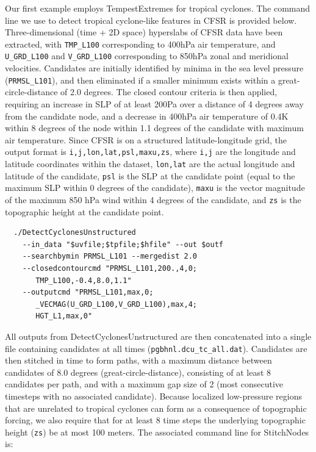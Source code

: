 \documentclass[gmdd, hvmath, online]{copernicus_discussions}
\begin{document}
Our first example employs TempestExtremes for tropical cyclones.  The command line we use to detect tropical cyclone-like features in CFSR is provided below.  Three-dimensional (time + 2D space) hyperslabs of CFSR data have been extracted, with \texttt{TMP\_L100} corresponding to 400hPa air temperature, and \texttt{U\_GRD\_L100} and \texttt{V\_GRD\_L100} corresponding to 850hPa zonal and meridional velocities.  Candidates are initially identified by minima in the sea level pressure (\texttt{PRMSL\_L101}), and then eliminated if a smaller minimum exists within a great-circle-distance of 2.0 degrees.  The closed contour criteria is then applied, requiring an increase in SLP of at least 200Pa over a distance of 4 degrees away from the candidate node, and a decrease in 400hPa air temperature of 0.4K within 8 degrees of the node within 1.1 degrees of the candidate with maximum air temperature.  Since CFSR is on a structured latitude-longitude grid, the output format is \texttt{i,j,lon,lat,psl,maxu,zs}, where \texttt{i,j} are the longitude and latitude coordinates within the dataset, \texttt{lon,lat} are the actual longitude and latitude of the candidate, \texttt{psl} is the SLP at the candidate point (equal to the maximum SLP within 0 degrees of the candidate), \texttt{maxu} is the vector magnitude of the maximum 850 hPa wind within 4 degrees of the candidate, and \texttt{zs} is the topographic height at the candidate point.

{\small \begin{verbatim}
  ./DetectCyclonesUnstructured
    --in_data "$uvfile;$tpfile;$hfile" --out $outf
    --searchbymin PRMSL_L101 --mergedist 2.0
    --closedcontourcmd "PRMSL_L101,200.,4,0;
       TMP_L100,-0.4,8.0,1.1"
    --outputcmd "PRMSL_L101,max,0;
       _VECMAG(U_GRD_L100,V_GRD_L100),max,4;
       HGT_L1,max,0"
\end{verbatim}}

All outputs from DetectCyclonesUnstructured are then concatenated into a single file containing candidates at all times (\texttt{pgbhnl.dcu\_tc\_all.dat}).  Candidates are then stitched in time to form paths, with a maximum distance between candidates of 8.0 degrees (great-circle-distance), consisting of at least 8 candidates per path, and with a maximum gap size of 2 (most consecutive timesteps with no associated candidate).  Because localized low-pressure regions that are unrelated to tropical cyclones can form as a consequence of topographic forcing, we also require that for at least 8 time steps the underlying topographic height (\texttt{zs}) be at most 100 meters.  The associated command line for StitchNodes is:
\end{document}
